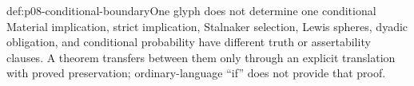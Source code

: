 \begin{hbwarning}{def:p08-conditional-boundary}{One glyph does not determine one conditional}
Material implication, strict implication, Stalnaker selection,
Lewis spheres, dyadic obligation, and conditional probability have different
truth or assertability clauses. A theorem transfers between them only through
an explicit translation with proved preservation; ordinary-language ``if''
does not provide that proof.
\end{hbwarning}
